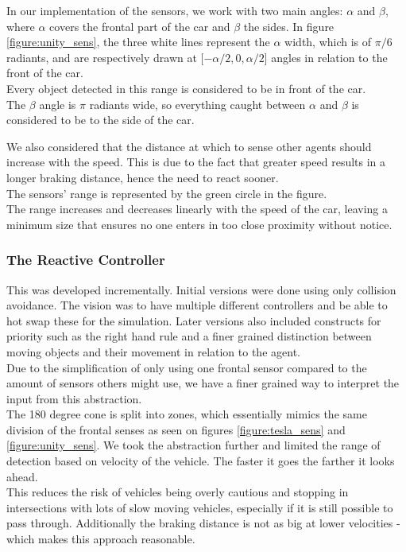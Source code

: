 In our implementation of the sensors, we work with two main angles: $\alpha$ and $\beta$, where $\alpha$  covers the frontal part of the car and $\beta$ the sides.
In figure \ref{figure:unity_sens}, the three white lines represent the $\alpha$ width, which is of $\pi/6$ radiants, and are respectively drawn at [$-\alpha/2, 0, \alpha/2$] angles in relation to the front of the car.\\
Every object detected in this range is considered to be in front of the car.\\

The $\beta$ angle is $\pi$ radiants wide, so everything caught between $\alpha$ and $\beta$ is considered to be to the side of the car.


We also considered that the distance at which to sense other agents should increase with the speed.
This is due to the fact that greater speed results in a longer braking distance, hence the need to react sooner.\\
The sensors' range is represented by the green circle in the figure. \\
The range increases and decreases linearly with the speed of the car, leaving a minimum size that ensures no one enters in too close proximity without notice. 



\subsubsection{The Reactive Controller}
This was developed incrementally. Initial versions were done using only collision avoidance.
The vision was to have multiple different controllers and be able to hot swap these for the simulation.
Later versions also included constructs for priority such as the right hand rule and a finer grained distinction between moving objects and their movement in relation to the agent.\\

Due to the simplification of only using one frontal sensor compared to the amount of sensors others might use, we have a finer grained way to interpret the input from this abstraction.\\
The 180 degree cone is split into zones, which essentially mimics the same division of the frontal senses as seen on figures \ref{figure:tesla_sens} and \ref{figure:unity_sens}.
We took the abstraction further and limited the range of detection based on velocity of the vehicle. The faster it goes the farther it looks ahead.\\
This reduces the risk of vehicles being overly cautious and stopping in intersections with lots of slow moving vehicles, especially if it is still possible to pass through.
Additionally the braking distance is not as big at lower velocities - which makes this approach reasonable.\\

